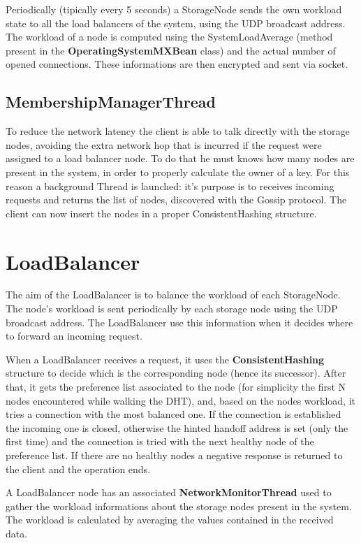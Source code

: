 \documentclass[12pt, a4paper, oneside] {book}
\begin{document}
Periodically (tipically every 5 seconds) a StorageNode sends the own workload state to all the load balancers of the system, using the UDP broadcast address.\\
The workload of a node is computed using the SystemLoadAverage (method present in the \textbf{OperatingSystemMXBean} class) and the actual number of opened connections.
These informations are then encrypted and sent via socket.

\subsection{MembershipManagerThread}

To reduce the network latency the client is able to talk directly with the storage nodes, avoiding the extra network hop that is incurred if the request were assigned to a load balancer node.
To do that he must knows how many nodes are present in the system, in order to properly calculate the owner of a key.
For this reason a background Thread is launched: it's purpose is to receives incoming requests and returns the list of nodes, discovered with the Gossip protocol.
The client can now insert the nodes in a proper ConsistentHashing structure.

\section{LoadBalancer}

The aim of the LoadBalancer is to balance the workload of each StorageNode. The node's workload is sent periodically by each storage node using the UDP broadcast address.
The LoadBalancer use this information when it decides where to forward an incoming request.

When a LoadBalancer receives a request, it uses the \textbf{ConsistentHashing} structure to decide which is the corresponding node (hence its successor).
After that, it gets the preference list associated to the node (for simplicity the first N nodes encountered while walking the DHT), and, based on the nodes workload,
it tries a connection with the most balanced one. If the connection is established the incoming one is closed, otherwise the hinted handoff address is set (only the first time)
and the connection is tried with the next healthy node of the preference list. If there are no healthy nodes a negative response is returned to the client and the operation ends.

A LoadBalancer node has an associated \textbf{NetworkMonitorThread} used to gather the workload informations about the storage nodes present in the system.
The workload is calculated by averaging the values contained in the received data.
\end{document}

